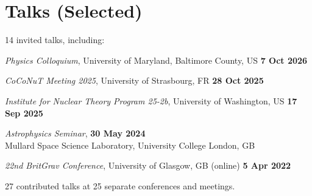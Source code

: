 \section{Talks (Selected)}

14 invited talks, including:
%
\begin{etaremune}
    \item \textit{Physics Colloquium},
    University of Maryland, Baltimore County, US \hfill \textbf{7 Oct 2026}
    \item \textit{CoCoNuT Meeting 2025}, University of Strasbourg, FR
    \hfill \textbf{28 Oct 2025}
    \item \textit{Institute for Nuclear Theory Program 25-2b},
    University of Washington, US \hfill \textbf{17 Sep 2025}
    \item \textit{Astrophysics Seminar}, \hfill \textbf{30 May 2024} \\
    Mullard Space Science Laboratory, University College London, GB
    \item \textit{22nd BritGrav Conference}, University of Glasgow, GB (online)
    \hfill \textbf{5 Apr 2022}
\end{etaremune}
%
27 contributed talks at 25 separate conferences and meetings.
